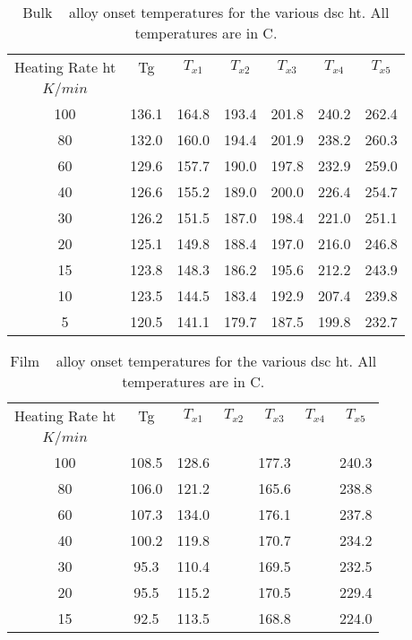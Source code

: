 \documentclass[a4paper,12pt,oneside]{article}%
\begin{document}
\begin{table}[h]
	\centering
	\begin{tabular}{ c c c c c c c }
		\toprule
		Heating Rate \acrshort{ht} & \acrshort{Tg} & $T_{x1}$ & $T_{x2}$ & $T_{x3}$ & $T_{x4}$ & $T_{x5}$ \\ 
		$K/min$ & & & & & & \\
		\midrule
		100 & 136.1 & 164.8 & 193.4 & 201.8 & 240.2 & 262.4 \\
		80  & 132.0 & 160.0 & 194.4 & 201.9 & 238.2 & 260.3 \\
		60  & 129.6 & 157.7 & 190.0 & 197.8 & 232.9 & 259.0 \\
		40  & 126.6 & 155.2 & 189.0 & 200.0 & 226.4 & 254.7 \\
		30  & 126.2 & 151.5 & 187.0 & 198.4 & 221.0 & 251.1 \\
		20  & 125.1 & 149.8 & 188.4 & 197.0 & 216.0 & 246.8 \\
		15  & 123.8 & 148.3 & 186.2 & 195.6 & 212.2 & 243.9 \\
		10  & 123.5 & 144.5 & 183.4 & 192.9 & 207.4 & 239.8 \\
		5   & 120.5 & 141.1 & 179.7 & 187.5 & 199.8 & 232.7 \\ 
		\bottomrule
	\end{tabular}
	\caption{Bulk \MgZnCa~ alloy onset temperatures for the various \acrshort{dsc}  \acrshort{ht}. All temperatures are in \degree C.}
	\label{tab:BulkOnsets}
\end{table}

\begin{table}[h]
	\centering
	\begin{tabular}{ c c c c c c c }
		\toprule
		Heating Rate \acrshort{ht} & \acrshort{Tg} & $T_{x1}$ & $T_{x2}$ & $T_{x3}$ & $T_{x4}$ & $T_{x5}$ \\ 
		$K/min$ & & & & & & \\
		\midrule
		100 & 108.5 & 128.6 &  & 177.3 &  & 240.3 \\
		80  & 106.0 & 121.2 &  & 165.6 &  & 238.8 \\
		60  & 107.3 & 134.0 &  & 176.1 &  & 237.8 \\
		40  & 100.2 & 119.8 &  & 170.7 &  & 234.2 \\
		30  & 95.3  & 110.4 &  & 169.5 &  & 232.5 \\
		20  & 95.5  & 115.2 &  & 170.5 &  & 229.4 \\
		15  & 92.5  & 113.5 &  & 168.8 &  & 224.0 \\
		\bottomrule
	\end{tabular}
	\caption{Film \MgZnCa~ alloy onset temperatures for the various \acrshort{dsc}  \acrshort{ht}. All temperatures are in \degree C.}
	\label{tab:DSCOnsets}
\end{table}
\end{document}

